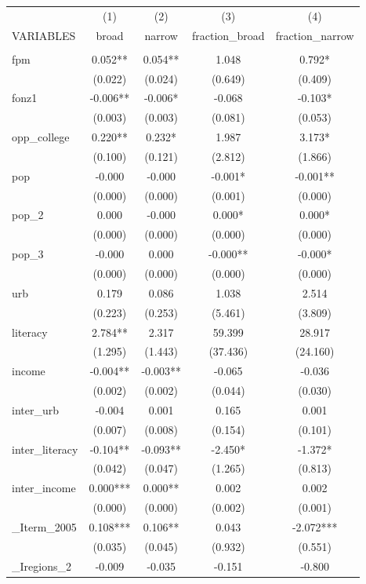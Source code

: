 \documentclass[]{article}
\begin{document}
\begin{tabular}{lcccc} \hline
 & (1) & (2) & (3) & (4) \\
VARIABLES & broad & narrow & fraction\_broad & fraction\_narrow \\ \hline
 &  &  &  &  \\
fpm & 0.052** & 0.054** & 1.048 & 0.792* \\
 & (0.022) & (0.024) & (0.649) & (0.409) \\
fonz1 & -0.006** & -0.006* & -0.068 & -0.103* \\
 & (0.003) & (0.003) & (0.081) & (0.053) \\
opp\_college & 0.220** & 0.232* & 1.987 & 3.173* \\
 & (0.100) & (0.121) & (2.812) & (1.866) \\
pop & -0.000 & -0.000 & -0.001* & -0.001** \\
 & (0.000) & (0.000) & (0.001) & (0.000) \\
pop\_2 & 0.000 & -0.000 & 0.000* & 0.000* \\
 & (0.000) & (0.000) & (0.000) & (0.000) \\
pop\_3 & -0.000 & 0.000 & -0.000** & -0.000* \\
 & (0.000) & (0.000) & (0.000) & (0.000) \\
urb & 0.179 & 0.086 & 1.038 & 2.514 \\
 & (0.223) & (0.253) & (5.461) & (3.809) \\
literacy & 2.784** & 2.317 & 59.399 & 28.917 \\
 & (1.295) & (1.443) & (37.436) & (24.160) \\
income & -0.004** & -0.003** & -0.065 & -0.036 \\
 & (0.002) & (0.002) & (0.044) & (0.030) \\
inter\_urb & -0.004 & 0.001 & 0.165 & 0.001 \\
 & (0.007) & (0.008) & (0.154) & (0.101) \\
inter\_literacy & -0.104** & -0.093** & -2.450* & -1.372* \\
 & (0.042) & (0.047) & (1.265) & (0.813) \\
inter\_income & 0.000*** & 0.000** & 0.002 & 0.002 \\
 & (0.000) & (0.000) & (0.002) & (0.001) \\
\_Iterm\_2005 & 0.108*** & 0.106** & 0.043 & -2.072*** \\
 & (0.035) & (0.045) & (0.932) & (0.551) \\
\_Iregions\_2 & -0.009 & -0.035 & -0.151 & -0.800 \\

\end{tabular}
\end{document}
